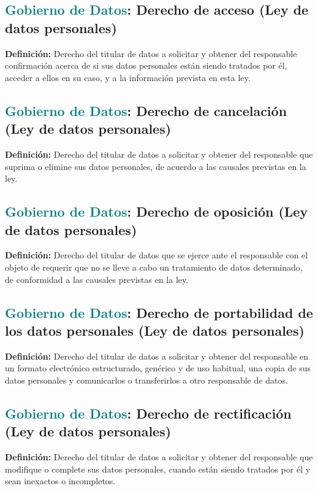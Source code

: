\documentclass[12pt]{article}
\begin{document}
\subsection{\textcolor{teal}{Gobierno de Datos}: Derecho de acceso (Ley de datos personales)}
\textbf{Definición:} Derecho del titular de datos a solicitar y obtener del responsable confirmación acerca de si sus datos personales están siendo tratados por él, acceder a ellos en su caso, y a la información prevista en esta ley. 
\subsection{\textcolor{teal}{Gobierno de Datos}: Derecho de cancelación (Ley de datos personales)}
\textbf{Definición:} Derecho del titular de datos a solicitar y obtener del responsable que suprima o elimine sus datos personales, de acuerdo a las causales previstas en la ley. 
\subsection{\textcolor{teal}{Gobierno de Datos}: Derecho de oposición (Ley de datos personales)}
\textbf{Definición:} Derecho del titular de datos que se ejerce ante el responsable con el objeto de requerir que no se lleve a cabo un tratamiento de datos determinado, de conformidad a las causales previstas en la ley. 
\subsection{\textcolor{teal}{Gobierno de Datos}: Derecho de portabilidad de los datos personales (Ley de datos personales)}
\textbf{Definición:} Derecho del titular de datos a solicitar y obtener del responsable en un formato electrónico estructurado, genérico y de uso habitual, una copia de sus datos personales y comunicarlos o transferirlos a otro responsable de datos.
\subsection{\textcolor{teal}{Gobierno de Datos}: Derecho de rectificación (Ley de datos personales)}
\textbf{Definición:} Derecho del titular de datos a solicitar y obtener del responsable que modifique o complete sus datos personales, cuando están siendo tratados por él y sean inexactos o incompletos. 
\end{document}
